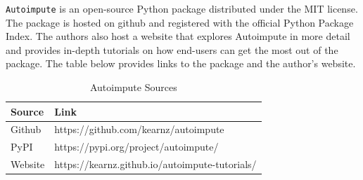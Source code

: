 \documentclass[12pt,oneside]{chicagocapstone}
\begin{document}
\texttt{Autoimpute} is an open-source Python package distributed under
the MIT license. The package is hosted on github and registered with the
official Python Package Index. The authors also host a website that
explores Autoimpute in more detail and provides in-depth tutorials on
how end-users can get the most out of the package. The table below
provides links to the package and the author's website.
\begin{table}[!h]

\caption{\label{tab:appendixa}Autoimpute Sources}
\begin{tabu} to 
\toprule
\begingroup\fontsize{13}{15}\selectfont \textbf{Source}\endgroup & \begingroup\fontsize{13}{15}\selectfont \textbf{Link}\endgroup\\
\midrule
Github & https://github.com/kearnz/autoimpute\\
PyPI & https://pypi.org/project/autoimpute/\\
Website & https://kearnz.github.io/autoimpute-tutorials/\\
\bottomrule
\end{tabu}
\end{table}
\end{document}
